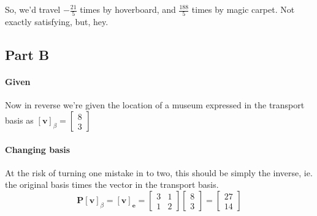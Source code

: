 \documentclass{article}
\begin{document}
                So, we'd travel $-\frac{21}{5}$ times by hoverboard, and $\frac{188}{5}$ times by magic carpet.
                Not exactly satisfying, but, hey.
        \subsection{Part B}
            \paragraph{Given}
                Now in reverse we're given the location of a museum expressed
                in the transport basis as $\left[\mathbf{v}\right]_{\beta}=\begin{bmatrix}8\\3\end{bmatrix}$
            \paragraph{Changing basis}
                At the risk of turning one mistake in to two, this should be simply the inverse, ie. the original basis
                times the vector in the transport basis.
                \[
                    \mathbf{P}\left[\mathbf{v}\right]_{\beta}
                    =
                    \left[\mathbf{v}\right]_{\mathbf{e}}
                    =
                    \begin{bmatrix}
                        3 & 1 \\ 1 & 2
                    \end{bmatrix}
                    \begin{bmatrix}
                        8\\3
                    \end{bmatrix}
                    =
                    \begin{bmatrix}
                        27\\14
                    \end{bmatrix}
                \]
\end{document}
